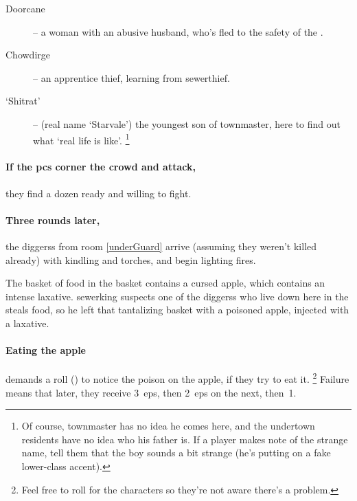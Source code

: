 \begin{multicols}{2}
\begin{description}
  \item[Doorcane] -- a woman with an abusive husband, who's fled to the safety of the .
  \item[Chowdirge] -- an apprentice thief, learning from \gls{sewerthief}.
  \item[`Shitrat'] -- (real name `Starvale') the youngest son of \gls{townmaster}, here to find out what `real life is like'.%
  \footnote{Of course, \gls{townmaster} has no idea he comes here, and the undertown residents have no idea who his father is.  If a player makes note of the strange name, tell them that the boy sounds a bit strange (he's putting on a fake lower-class accent).}
\end{description}

\paragraph{If the \glspl{pc} corner the crowd and attack,}
they find a dozen ready and willing to fight.

\sewerking



\paragraph{Three rounds later,}
the \glspl{diggers} from room \ref{underGuard} arrive (assuming they weren't killed already) with kindling and torches, and begin lighting fires.


\begin{exampletext}
  The basket of food in the basket contains a cursed apple, which contains an intense laxative.
  \Gls{sewerking} suspects one of the \glspl{diggers} who live down here in the  steals food, so he left that tantalizing basket with a poisoned apple, injected with a laxative.
\end{exampletext}

\paragraph{Eating the apple}
demands a  roll (\tn[11]) to notice the poison on the apple, if they try to eat it.%
\footnote{Feel free to roll for the characters so they're not aware there's a problem.}
Failure means that  later, they receive 3~\glspl{ep}, then 2~\glspl{ep} on the next, then~1.


\end{multicols}
